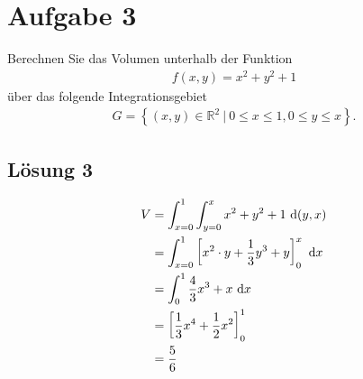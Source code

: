 \documentclass[main.tex]{subfiles}
\begin{document}
\section{Aufgabe 3}
Berechnen Sie das Volumen unterhalb der Funktion
\begin{align*}
    f(x,y) = x^2 + y^2 + 1
\end{align*}
über das folgende Integrationsgebiet
\begin{align*}
    G = \left\{ (x,y) \in \mathbb{R}^2 \ | \ 0 \leq x \leq 1, 0 \leq y \leq x \right\}.
\end{align*}

\subsection{Lösung 3}

\begin{align*}
    V &= \int_{x=0}^{1} \int_{y=0}^{x} x^2 + y^2 + 1 ~\mathrm{d}(y,x) \\
      &= \int_{x=0}^{1} \left[ x^2\cdot y + \frac{1}{3} y^3 + y \right]_{0}^{x}  ~\mathrm{d}x \\
      &= \int_{0}^{1} \frac{4}{3} x^3 + x ~\mathrm{d}x \\
      &= \left[ \frac{1}{3} x^4 + \frac{1}{2} x^2 \right]_{0}^{1} \\
      &= \frac{5}{6}
\end{align*}
\end{document}
